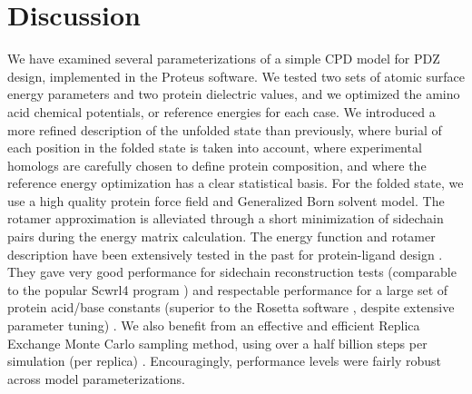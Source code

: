 \documentclass[12pt]{article}
\begin{document}
\section{Discussion}
We have examined several parameterizations of a simple CPD model for PDZ design, implemented in the Proteus software. We tested two
sets of atomic surface energy parameters and two protein dielectric values, and we optimized the amino acid chemical potentials, or
reference energies for each case. We introduced a more refined description of the unfolded state than previously, where burial of
each position in the folded state is taken into account, where experimental homologs are carefully chosen to define protein composition,
and where the reference energy optimization has a clear statistical basis. For the folded state, we use a high quality protein force
field and Generalized Born solvent model. The rotamer approximation is alleviated through a short minimization of sidechain pairs
during the energy matrix calculation. The energy function and rotamer description have been extensively tested in the past for
protein-ligand design \cite{Polydorides11,Druart16}. They gave very good performance for sidechain reconstruction tests (comparable
to the popular Scwrl4 program \cite{Scwrl}) \cite{Gaillard16} and respectable performance for a large set of protein acid/base
constants (superior to the Rosetta software \cite{Kilambi12}, despite extensive parameter tuning) \cite{Polydorides13}. We also
benefit from an effective and efficient Replica Exchange Monte Carlo sampling method, using over a half billion steps per simulation
(per replica) \cite{Mignon16}. Encouragingly, performance levels were fairly robust across model parameterizations.
\end{document}
